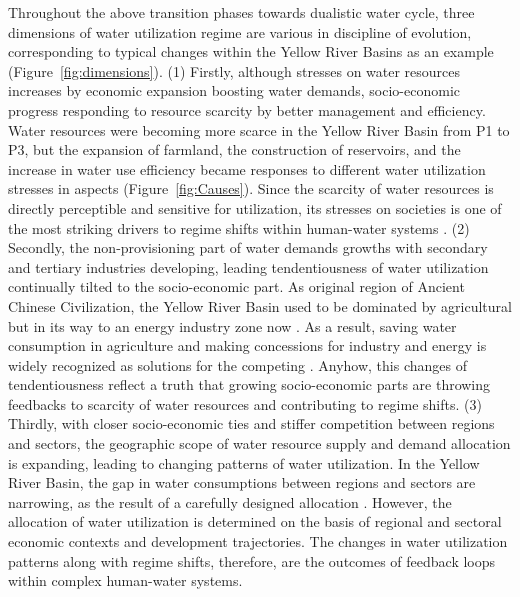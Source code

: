 \documentclass[9pt, twocolumn, twoside, lineno]{pnas-new}
\begin{document}
Throughout the above transition phases towards dualistic water cycle, three dimensions of water utilization regime are various in discipline of evolution, corresponding to typical changes within the Yellow River Basins as an example (Figure~\ref{fig:dimensions}). 
(1) Firstly, although stresses on water resources increases by economic expansion boosting water demands, socio-economic progress responding to resource scarcity by better management and efficiency. Water resources were becoming more scarce in the Yellow River Basin from P1 to P3, but the expansion of farmland, the construction of reservoirs, and the increase in water use efficiency became responses to different water utilization stresses in aspects (Figure~\ref{fig:Causes}). Since the scarcity of water resources is directly perceptible and sensitive for utilization, its stresses on societies is one of the most striking drivers to regime shifts within human-water systems \cite{qinFlexibilityIntensityGlobal2019}.
(2) Secondly, the non-provisioning part of water demands growths with secondary and tertiary industries developing, leading tendentiousness of water utilization continually tilted to the socio-economic part. As original region of Ancient Chinese Civilization, the Yellow River Basin used to be dominated by agricultural but in its way to an energy industry zone now \cite{WillEnergyBases}. As a result, saving water consumption in agriculture and making concessions for industry and energy is widely recognized as solutions for the competing \cite{xiangWillEnergyIndustry2016,bebbWaterRightsTransfers2011}. Anyhow, this changes of tendentiousness reflect a truth that growing socio-economic parts are throwing feedbacks to scarcity of water resources and contributing to regime shifts.
(3) Thirdly, with closer socio-economic ties and stiffer competition between regions and sectors, the geographic scope of water resource supply and demand allocation is expanding, leading to changing patterns of water utilization. In the Yellow River Basin, the gap in water consumptions between regions and sectors are narrowing, as the result of a carefully designed allocation \cite{wangThirtyYearsYellow2018}. However, the allocation of water utilization is determined on the basis of regional and sectoral economic contexts and development trajectories\cite{wangThirtyYearsYellow2018}. The changes in water utilization patterns along with regime shifts, therefore, are the outcomes of feedback loops within complex human-water systems.
\end{document}
